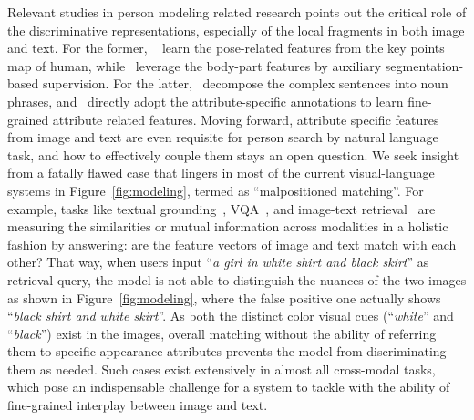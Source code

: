 \documentclass[runningheads]{llncs}
\begin{document}
Relevant studies in person modeling related research points out the critical role of the discriminative representations, especially of the local fragments in both image and text. For the former, ~\cite{su2017pose,zheng2019pose} learn the pose-related features from the key points map of human, while~\cite{kalayeh2018human,liang2018look} leverage the body-part features by auxiliary segmentation-based supervision.
For the latter,~\cite{li2017person,li2017identity,zhang2018deep} decompose the complex sentences into noun phrases, and~\cite{ijcai2018-153,layne2014attributes} directly adopt the attribute-specific annotations to learn fine-grained attribute related features. 
Moving forward, attribute specific features from image and text are even requisite for person search by natural language task, and how to effectively couple them stays an open question. We seek insight from a fatally flawed case that lingers in most of the current visual-language systems in Figure~\ref{fig:modeling}, termed as ``malpositioned matching''. For example, tasks like textual grounding~\cite{rohrbach2016grounding,plummer2015flickr30k}, VQA~\cite{antol2015vqa}, and image-text retrieval~\cite{shekhar2012word,jeon2003automatic} are measuring the similarities or mutual information across modalities in a holistic fashion by answering: are the feature vectors of image and text match with each other? 
That way, when users input ``\textit{a girl in white shirt and black skirt}'' as retrieval query, the model is not able to distinguish the nuances of the two images as shown in Figure~\ref{fig:modeling}, where the false positive one actually shows ``\textit{black shirt and white skirt}''.
As both the distinct color visual cues (``\textit{white}'' and ``\textit{black}'') exist in the images, overall matching without the ability of referring them to specific appearance attributes prevents the model from discriminating them as needed. Such cases exist extensively in almost all cross-modal tasks, which pose an indispensable challenge for a system to tackle with the ability of fine-grained interplay between image and text.
\end{document}
